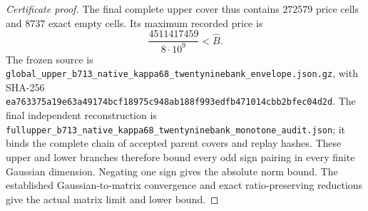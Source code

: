 \begin{proof}[Certificate proof]
The final complete upper cover thus contains $272579$ price cells and
$8737$ exact empty cells. Its maximum recorded price is
\[
 \frac{4511417459}{8\cdot10^9}<\widehat B.
\]
The frozen source is
\texttt{global\_\allowbreak upper\_\allowbreak b713\_\allowbreak native\_\allowbreak kappa68\_\allowbreak twentyninebank\_\allowbreak envelope.json.gz},
with SHA-256
\texttt{ea763375a19e63a49174bcf18975c948ab188f993edfb471014cbb2bfec04d2d}.
The final independent reconstruction is
\texttt{fullupper\_\allowbreak b713\_\allowbreak native\_\allowbreak kappa68\_\allowbreak twentyninebank\_\allowbreak monotone\_\allowbreak audit.json};
it binds the complete chain of accepted parent covers and replay hashes.
These upper and lower branches therefore bound every odd sign pairing
in every finite Gaussian dimension. Negating one sign gives the absolute
norm bound. The established Gaussian-to-matrix convergence and exact
ratio-preserving reductions give the actual matrix limit and lower bound.
\end{proof}

